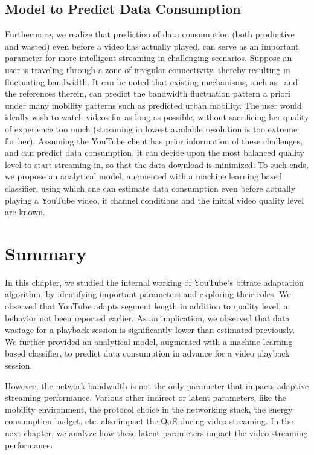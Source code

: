 \subsection{Model to Predict Data Consumption} Furthermore, we realize that prediction of data consumption (both productive and wasted) even before a video has actually played, can serve as an important parameter for more intelligent streaming in challenging scenarios.
Suppose an user is traveling through a zone of irregular connectivity, thereby resulting in fluctuating bandwidth. It can be noted that existing mechanisms, such as~\cite{Zou2015} and the references therein, can predict the bandwidth fluctuation pattern a priori under many mobility patterns such as predicted urban mobility.  
The user would ideally wish to watch videos for as long as possible, without sacrificing her quality of experience too much (streaming in lowest available resolution is too extreme for her). 
Assuming the YouTube client has prior information of these challenges, and can predict data consumption, it can decide upon the most balanced quality level to start streaming in, so that the data download is minimized.
To such ends, we propose an analytical model, augmented with a machine learning based classifier, using which one can estimate data consumption even before actually playing a YouTube video, if channel conditions and the initial video quality level are known.

\section{Summary}
In this chapter, we studied the internal working of YouTube’s bitrate
adaptation algorithm, by identifying important parameters and
exploring their roles. We observed that YouTube adapts segment
length in addition to quality level, a behavior not been reported
earlier. As an implication, we observed that data wastage for a playback session is significantly lower than estimated previously. We
further provided an analytical model, augmented with a machine
learning based classifier, to predict data consumption in advance
for a video playback session. 

However, the network bandwidth is not the only parameter that impacts adaptive streaming performance. Various other indirect or latent parameters, like the mobility environment, the protocol choice in the networking stack, the energy consumption budget, etc. also impact the QoE during video streaming. In the next chapter, we analyze how these latent parameters impact the video streaming performance. 


